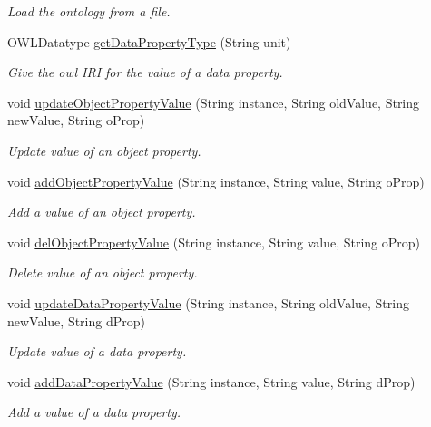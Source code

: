 \begin{DoxyCompactItemize}
\begin{DoxyCompactList}\small\item\em Load the ontology from a file. \end{DoxyCompactList}\item 
OWLDatatype \hyperlink{class_ontology_1_1_ontology_af49e735496a324a580a621944b522d28}{getDataPropertyType} (String unit)
\begin{DoxyCompactList}\small\item\em Give the owl IRI for the value of a data property. \end{DoxyCompactList}\item 
void \hyperlink{class_ontology_1_1_ontology_a0b4bb6f4edb76d65953fed6f32d2df58}{updateObjectPropertyValue} (String instance, String oldValue, String newValue, String oProp)
\begin{DoxyCompactList}\small\item\em Update value of an object property. \end{DoxyCompactList}\item 
void \hyperlink{class_ontology_1_1_ontology_a701a9c979927464fc11ad0fa16a547ed}{addObjectPropertyValue} (String instance, String value, String oProp)
\begin{DoxyCompactList}\small\item\em Add a value of an object property. \end{DoxyCompactList}\item 
void \hyperlink{class_ontology_1_1_ontology_a7e646f95cb6d1f369c37f642d27dbc6c}{delObjectPropertyValue} (String instance, String value, String oProp)
\begin{DoxyCompactList}\small\item\em Delete value of an object property. \end{DoxyCompactList}\item 
void \hyperlink{class_ontology_1_1_ontology_a05b30edf0ceb3ffae3e28dc9f53c4e8c}{updateDataPropertyValue} (String instance, String oldValue, String newValue, String dProp)
\begin{DoxyCompactList}\small\item\em Update value of a data property. \end{DoxyCompactList}\item 
void \hyperlink{class_ontology_1_1_ontology_a63a9f169a40e2e134e9d1b6ae0c9623e}{addDataPropertyValue} (String instance, String value, String dProp)
\begin{DoxyCompactList}\small\item\em Add a value of a data property. \end{DoxyCompactList}\item 

\end{DoxyCompactItemize}
